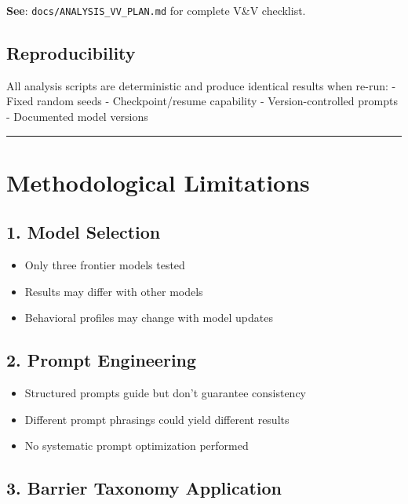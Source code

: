 \documentclass[
  letterpaper,
]{report}
\providecommand{\tightlist}{%
  \setlength{\itemsep}{0pt}\setlength{\parskip}{0pt}}
\begin{document}
\textbf{See}: \texttt{docs/ANALYSIS\_VV\_PLAN.md} for complete V\&V
checklist.

\subsection{Reproducibility}\label{reproducibility}

All analysis scripts are deterministic and produce identical results
when re-run: - Fixed random seeds - Checkpoint/resume capability -
Version-controlled prompts - Documented model versions

\begin{center}\rule{0.5\linewidth}{0.5pt}\end{center}

\section{Methodological Limitations}\label{methodological-limitations}

\subsection{1. Model Selection}\label{model-selection}

\begin{itemize}
\tightlist
\item
  Only three frontier models tested
\item
  Results may differ with other models
\item
  Behavioral profiles may change with model updates
\end{itemize}

\subsection{2. Prompt Engineering}\label{prompt-engineering}

\begin{itemize}
\tightlist
\item
  Structured prompts guide but don't guarantee consistency
\item
  Different prompt phrasings could yield different results
\item
  No systematic prompt optimization performed
\end{itemize}

\subsection{3. Barrier Taxonomy
Application}\label{barrier-taxonomy-application}
\end{document}
